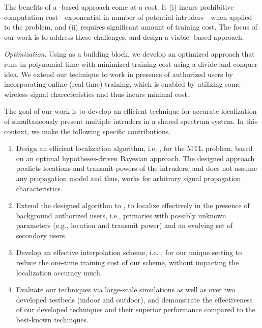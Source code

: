 The benefits of a \mtl-based approach come at a cost. It
(i) incurs prohibitive computation cost---exponential in number of
potential intruders---when applied to the \mtl problem, and (ii)
requires significant amount of training cost. The focus of our work is
to address these challenges, and design a viable \map-based approach.

\emph{Optimization}. Using \map as a building block, we develop an optimized
approach that runs in polynomial time with minimized training cost using a divide-and-conquer idea.
We extend our technique to work in presence of authorized users by
incorporating online (real-time) training, which is enabled by utilizing some wireless signal charecteristics and thus incurs minimal cost.


  The goal of our work is to develop an
efficient technique for accurate localization of simultaneously
present multiple intruders in a shared spectrum system. In this
context, we make the following specific contributions. 
\begin{enumerate}
\item
Design an efficient localization algorithm, i.e. \ouralgo, for the MTL problem, based
on an optimal hypotheses-driven Bayesian approach. The designed
approach predicts locations and transmit powers of the intruders, and
does not assume any propagation model and thus, works for arbitrary
signal propagation characteristics.

\item
Extend the designed algorithm to \ouralgoss, to localize effectively in the presence
of background authorized users, i.e., primaries with possibly unknown
parameters (e.g., location and transmit power) and an evolving set of
secondary users.

\item
Develop an effective interpolation scheme, i.e. \ildw, for our unique setting to
reduce the one-time training cost of our scheme, without impacting the
localization accuracy much.

\item
Evaluate our techniques via large-scale simulations as well as over
two developed testbeds (indoor and outdoor), and demonstrate the
effectiveness of our developed techniques and their superior
performance compared to the best-known techniques.
\end{enumerate}

